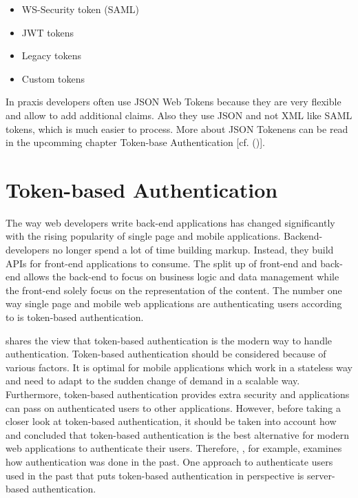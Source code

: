 \begin{itemize}
	\item WS-Security token (SAML)
	\item JWT tokens
	\item Legacy tokens
	\item Custom tokens
\end{itemize}

In praxis developers often use JSON Web Tokens because they are very flexible and allow to add additional claims. Also they use JSON and not XML like SAML tokens, which is much easier to process. More about JSON Tokenens can be read in the upcomming chapter Token-base Authentication [cf. (\cite{Spencer:2018:APISecurity})].

 


\section{Token-based Authentication}
\label{tokenBasedAuthentication}

The way web developers write back-end applications has changed significantly with the rising popularity of single page and mobile applications. Backend-developers no longer spend a lot of time building markup. Instead, they build APIs for front-end applications to consume. The split up of front-end and back-end allows the back-end to focus on business logic and data management while the front-end solely focus on the representation of the content. The number one way single page and mobile web applications are authenticating users according to \cite{Tkalec:2015} is token-based authentication.

\cite{Serilleja:2015:Scothio} shares the view that token-based authentication is the modern way to handle authentication. Token-based authentication should be considered because of various factors. It is optimal for mobile applications which work in a stateless way and need to adapt to the sudden change of demand in a scalable way. Furthermore, token-based authentication provides extra security and applications can pass on authenticated users to other applications. However, before taking a closer look at token-based authentication, it should be taken into account how \cite{Serilleja:2015:Scothio} and \cite{Tkalec:2015} concluded that token-based authentication is the best alternative for modern web applications to authenticate their users. Therefore, \cite{Serilleja:2015:Scothio}, for example, examines how authentication was done in the past. One approach to authenticate users used in the past that puts token-based authentication in perspective is server-based authentication. 

